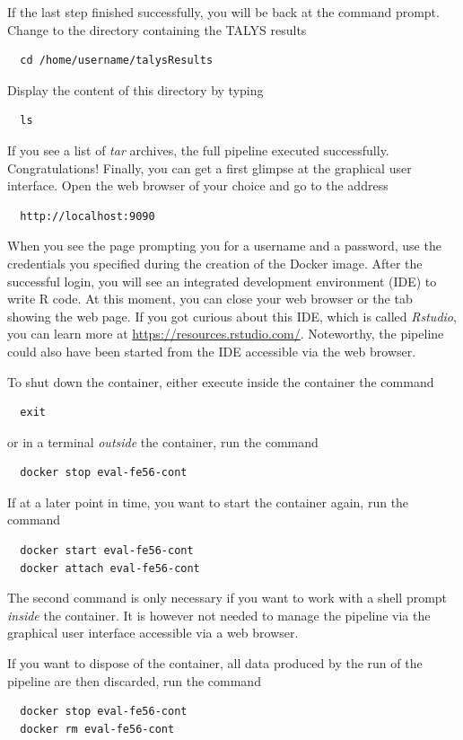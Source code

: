 \documentclass[12pt,a4paper]{scrartcl}
\begin{document}
If the last step finished successfully, you will be back at the command prompt.
Change to the directory containing the TALYS results
\begin{verbatim}
  cd /home/username/talysResults
\end{verbatim}
Display the content of this directory by typing
\begin{verbatim}
  ls
\end{verbatim}
If you see a list of \textit{tar} archives, the full pipeline executed successfully. Congratulations!
Finally, you can get a first glimpse at the graphical user interface.
Open the web browser of your choice and go to the address
\begin{verbatim}
  http://localhost:9090
\end{verbatim}
When you see the page prompting you for a username and a password,
use the credentials you specified during the creation of the Docker image.
After the successful login, you will see an integrated development environment (IDE) to write R code.
At this moment, you can close your web browser or the tab showing the web page.
If you got curious about this IDE, which is called \textit{Rstudio}, you can learn more at \url{https://resources.rstudio.com/}.
Noteworthy, the pipeline could also have been started from the IDE accessible via the web browser.

To shut down the container, either execute inside the container the command
\begin{verbatim}
  exit
\end{verbatim}
or in a terminal \textit{outside} the container, run the command
\begin{verbatim}
  docker stop eval-fe56-cont
\end{verbatim}
If at a later point in time, you want to start the container again, run the command
\begin{verbatim}
  docker start eval-fe56-cont
  docker attach eval-fe56-cont
\end{verbatim}
The second command is only necessary if you want to work with a shell prompt \textit{inside} the container.
It is however not needed to manage the pipeline via the graphical user interface accessible via a web browser.

If you want to dispose of the container, all data produced by the run of the pipeline are then discarded,
run the command
\begin{verbatim}
  docker stop eval-fe56-cont
  docker rm eval-fe56-cont
\end{verbatim}
\end{document}
